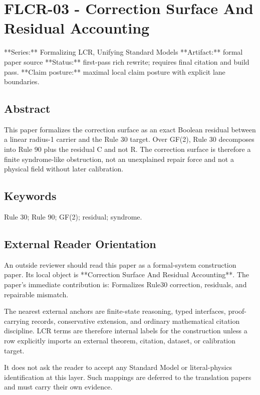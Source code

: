 \documentclass[11pt]{article}
\begin{document}
\section*{FLCR-03 - Correction Surface And Residual Accounting}

**Series:** Formalizing LCR, Unifying Standard Models
**Artifact:** formal paper source
**Status:** first-pass rich rewrite; requires final citation and build pass.
**Claim posture:** maximal local claim posture with explicit lane boundaries.

\subsection*{Abstract}

This paper formalizes the correction surface as an exact Boolean residual between a linear radius-1 carrier and the Rule 30 target. Over GF(2), Rule 30 decomposes into Rule 90 plus the residual C and not R. The correction surface is therefore a finite syndrome-like obstruction, not an unexplained repair force and not a physical field without later calibration.

\subsection*{Keywords}

Rule 30; Rule 90; GF(2); residual; syndrome.

\subsection*{External Reader Orientation}

An outside reviewer should read this paper as a formal-system construction paper. Its local object is **Correction Surface And Residual Accounting**. The paper's immediate contribution is: Formalizes Rule30 correction, residuals, and repairable mismatch.

The nearest external anchors are finite-state reasoning, typed interfaces, proof-carrying records, conservative extension, and ordinary mathematical citation discipline. LCR terms are therefore internal labels for the construction unless a row explicitly imports an external theorem, citation, dataset, or calibration target.

It does not ask the reader to accept any Standard Model or literal-physics identification at this layer. Such mappings are deferred to the translation papers and must carry their own evidence.
\end{document}

